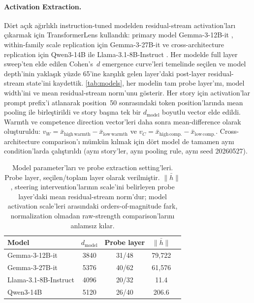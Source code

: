 \documentclass[twocolumn]{article}
\begin{document}
\paragraph{Activation Extraction.}
Dört açık ağırlıklı instruction-tuned modelden residual-stream activation'ları
çıkarmak için TransformerLens \citep{nanda2022transformerlens} kullandık:
primary model Gemma-3-12B-it \citep{gemmateam2025gemma3}, within-family scale
replication için Gemma-3-27B-it ve cross-architecture replication için Qwen3-14B
\citep{qwen2025qwen3} ile Llama-3.1-8B-Instruct
\citep{grattafiori2024llama3}. Her modelde full layer sweep'ten elde edilen
Cohen's~$d$ emergence curve'leri temelinde seçilen ve model depth'inin yaklaşık
yüzde 65'ine karşılık gelen layer'daki post-layer residual-stream state'ini
kaydettik. \autoref{tab:models}, her modelin tam probe layer'ını, model width'ini
ve mean residual-stream norm'unu gösterir. Her story için activation'lar prompt
prefix'i atlanarak position~50 sonrasındaki token position'larında mean pooling
ile birleştirildi ve story başına tek bir $d_\mathrm{model}$ boyutlu vector elde
edildi. Warmth ve competence direction vector'leri daha sonra mean-difference
olarak oluşturuldu:
$v_W = \bar{x}_\mathrm{high\,warmth} - \bar{x}_\mathrm{low\,warmth}$
ve
$v_C = \bar{x}_\mathrm{high\,comp.} - \bar{x}_\mathrm{low\,comp.}$.
Cross-architecture comparison'ı mümkün kılmak için dört model de tamamen aynı
condition'larda çalıştırıldı (aynı story'ler, aynı pooling rule, aynı seed
20260527).

\begin{table}[t]
\centering
\small
\caption{%
  Model parameter'ları ve probe extraction setting'leri.
  Probe layer, seçilen/toplam layer olarak verilmiştir.
  $\bar{\|h\|}$, steering intervention'larının scale'ini belirleyen probe
  layer'daki mean residual-stream norm'dur; model activation scale'leri
  arasındaki orders-of-magnitude fark, normalization olmadan raw-strength
  comparison'larını anlamsız kılar.
}
\label{tab:models}
\begin{tabular}{lcccc}
\toprule
Model & $d_\mathrm{model}$ & Probe layer & $\bar{\|h\|}$ \\
\midrule
Gemma-3-12B-it          & 3840 & 31/48 & 79{,}722 \\
Gemma-3-27B-it          & 5376 & 40/62 & 61{,}576 \\
Llama-3.1-8B-Instruct   & 4096 & 20/32 & 11.4     \\
Qwen3-14B               & 5120 & 26/40 & 206.6    \\
\bottomrule
\end{tabular}
\end{table}
\end{document}
